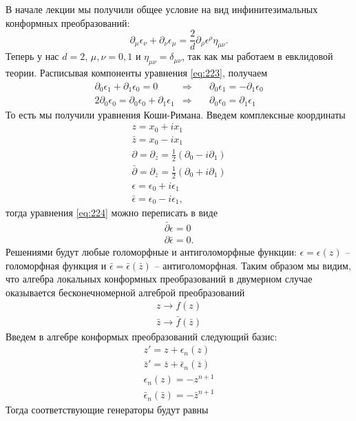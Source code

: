 \documentclass[a4paper,12pt]{article} \usepackage[utf8x]{inputenc} \usepackage[russian]{babel}
\theoremstyle{definition} \newtheorem{corollary}{Corollary}[theorem] \theoremstyle{definition}
\begin{document}
В начале лекции мы получили общее условие на вид инфинитезимальных конформных преобразований:
\begin{equation}
  \label{eq:223}
  \partial_{\mu}\epsilon_{\nu}+\partial_{\nu}\epsilon_{\mu}=\frac{2}{d} \partial_{\rho}\epsilon^{\rho}
\eta_{\mu\nu}.
\end{equation} Теперь у нас $d=2$, $\mu,\nu=0,1$ и $\eta_{\mu\nu}=\delta_{\mu\nu}$, так как мы
работаем в евклидовой теории. Расписывая компоненты уравнения \eqref{eq:223}, получаем
\begin{eqnarray}
  \label{eq:224}
  \partial_{0} \epsilon_{1}+ \partial_{1}\epsilon_{0}=0& \Rightarrow & \quad\partial_{0}
\epsilon_{1}=- \partial_{1}\epsilon_{0}\\
2\partial_{0}\epsilon_{0}=\partial_{0}\epsilon_{0}+\partial_{1}\epsilon_{1}& \Rightarrow&
\quad \partial_{0} \epsilon_{0}= \partial_{1}\epsilon_{1}
\end{eqnarray} То есть мы получили уравнения Коши-Римана. Введем комплексные координаты
\begin{eqnarray}
  \label{eq:225} z=x_{0}+i x_{1}\\ \bar z = x_{0}-i x_{1}\\
  \partial = \partial_{z}=\frac{1}{2}(\partial_{0}-i\partial_{1}) \\ \bar \partial=\partial_{\bar
z}=\frac{1}{2} (\partial_{0}+i \partial_{1})\\ \epsilon=\epsilon_{0}+i \epsilon_{1}\\ \bar
\epsilon=\epsilon_{0}-i \epsilon_{1},
\end{eqnarray} тогда уравнения \eqref{eq:224} можно переписать в виде
\begin{eqnarray}
  \label{eq:226} \bar \partial \epsilon=0\\
  \partial \bar \epsilon=0.
\end{eqnarray} Решениями будут любые голоморфные и антиголоморфные функции: $\epsilon=\epsilon(z)$
-- голоморфная функция и $\bar \epsilon=\bar \epsilon(\bar z)$ -- антиголоморфная. Таким образом мы
видим, что алгебра локальных конформных преобразований в двумерном случае оказывается
бесконечномерной алгеброй преобразований
\begin{eqnarray}
  \label{eq:227} z\to f(z)\\ \bar z \to \bar f(\bar z)
\end{eqnarray} Введем в алгебре конформых преобразований следующий базис:
\begin{eqnarray}
  \label{eq:228} z'=z+\epsilon_{n}(z)\\ \bar z'=\bar z+\bar \epsilon_{n}(\bar z)\\ \epsilon_{n}(z)=
-z^{n+1}\\ \bar \epsilon_{n}(\bar z)=-\bar z^{n+1}
\end{eqnarray} Тогда соответствующие генераторы будут равны
\end{document}
